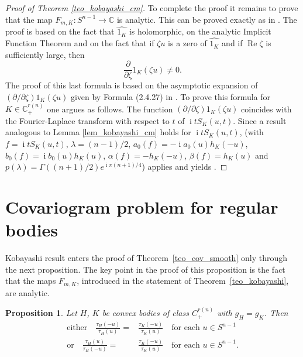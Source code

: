 \documentclass[a4paper]{amsart}
\newtheorem{proposition}[theorem]{Proposition}
\theoremstyle{definition}
\numberwithin{equation}{section}
\begin{document}
\begin{proof}[Proof of Theorem \ref{teo_kobayashi_cm}]
To complete the proof it remains to prove that the map $F_{m,K}:{S^{n-1}}\to{\mathbb{C}}$ is analytic.
This can be proved exactly as in \cite[Lemma 2.4.25]{Kob1}. The proof is based on the fact that ${\widehat{{{1_K}}}}$ is holomorphic, on the analytic Implicit Function Theorem and on the fact that if ${{\zeta}} u$ is a zero of ${\widehat{{{1_K}}}}$ and if ${\operatorname{Re}}{{\zeta}}$ is sufficiently large, then
\[
 \frac{{\partial}}{{{\partial}}{{\zeta}}}1_K({{\zeta}} u)\neq 0.
\]
The proof of this last formula is based on  the asymptotic expansion of $({{\partial}}/{{{\partial}}{{\zeta}}})1_K({{\zeta}} u)$ given by Formula (2.4.27) in \cite{Kob1}.
To prove this formula for $K\in{\mathbb{C}}^{{r(n)}}_+$ one argues as follows. The function $({{\partial}}/{{{\partial}}{{\zeta}}})1_K({{\zeta}} u)$ coincides with the Fourier-Laplace transform with respect to $t$ of ${\operatorname{i}} t S_K(u,t)$.
Since a result analogous to Lemma \ref{lem_kobayashi_cm} holds for ${\operatorname{i}} t S_K(u,t)$, \cite[Lemma 2.13]{Kob2} (with $f={\operatorname{i}} t S_K(u,t)$, ${{\lambda}}=(n-1)/2$, $a_0(f)=-{\operatorname{i}} a_0(u)h_K(-u)$, $b_0(f)={\operatorname{i}} b_0(u)h_K(u)$, ${{\alpha}}(f)=-h_K(-u)$, ${{\beta}}(f)=h_K(u)$ and $p({{\lambda}})=\Gamma\left((n+1)/2\right)e^{{\operatorname{i}}\pi(n+1)/4}$) applies  and yields \cite[Formula (2.4.27)]{Kob1}.
\end{proof}

\section{Covariogram problem for regular bodies}\label{sec_cov}
Kobayashi result enters the proof of Theorem~\ref{teo_cov_smooth} only through the next proposition. The key  point in the proof of this proposition is the fact that the maps $F_{m,K}$, introduced in the statement of Theorem~\ref{teo_kobayashi}, are analytic.
\begin{proposition}\label{prop_ratio_radii_curvature}
Let $H$, $K$ be convex bodies of class $C^{{r(n)}}_+$ with $g_H=g_K$. Then
\begin{align*}\label{equal_ratio_radii_curvature}
\text{either}\quad\frac{{\tau}_H(-u)}{{\tau}_H(u)}=& \frac{{\tau}_K(-u)}{{\tau}_K(u)}\quad\text{for each } u\in{S^{n-1}}\\
\text{or}\quad\frac{{\tau}_H(u)}{{\tau}_H(-u)}=& \frac{{\tau}_K(-u)}{{\tau}_K(u)}\quad\text{for each } u\in{S^{n-1}}.
\end{align*}
\end{proposition}
\end{document}
